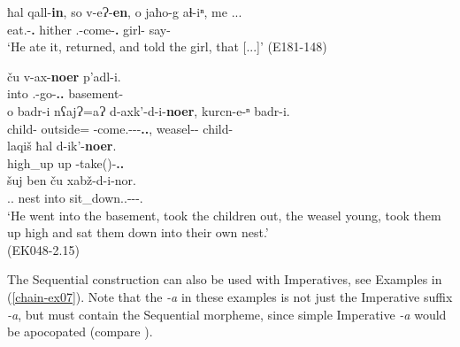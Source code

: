 \begin{exe}
	\ex\label{chain-ex02}
	\begin{xlist}
		
		
			\ex\label{chain-ex02a}
			\gll ħal qall-\textbf{in}, so v-eɁ-\textbf{en}, o jaħo-g aɬ-iⁿ, me ... \\
			{\Pv} eat.{\Pfv}-\textbf{{\Aor}.{\Seq}} hither {\M}.{\Sg}-come-\textbf{{\Aor}.{\Seq}} {\Dist} girl-{\All} say-{\Aor} {\Subord} \\
			\trans `He ate it, returned, and told the girl, that [...]'
			\hfill (E181-148)
		
		
		
			\ex\label{chain-ex02b}
			\gll ču v-ax-\textbf{noer} p'adl-i. \\
			into {\M}.{\Sg}-go-\textbf{{\Nw}.{\Rem}.{\Seq}} basement-{\Iness} \\
			
			\gll o badr-i nʕajɁ=aɁ d-axk'-d-i-\textbf{noer}, kurcn-e-ⁿ badr-i. \\
			{\Dist} child-{\Pl} outside={\Emph} {\D}-come.{\Pl}-{\D}-{\Tr}-\textbf{{\Nw}.{\Rem}.{\Seq}}, weasel-{\Obl}-{\Gen} child-{\Pl} \\
			
			\gll laqiš ħal d-ik'-\textbf{noer}. \\
			high\_up up {\D}-take({\Anim})-\textbf{{\Nw}.{\Rem}.{\Seq}}\\
			
			\gll šuj ben ču xabž-d-i-nor. \\
			{\Refl}.{\Pl}.{\Gen} nest into sit\_down.{\Pfv}.{\Pl}-{\D}-{\Tr}-{\Nw}.{\Rem} \\
			
			\trans `He went into the basement, took the children out, the weasel young, took them up high and sat them down into their own nest.' \\
			\hfill (EK048-2.15)
		
		
	\end{xlist}
\end{exe}

The Sequential construction can also be used with Imperatives, see Examples in (\ref{chain-ex07}). Note that the \textit{-a} in these examples is not just the Imperative suffix \textit{-a}, but must contain the Sequential morpheme, since simple Imperative \textit{-a} would be apocopated (compare ).\largerpage


